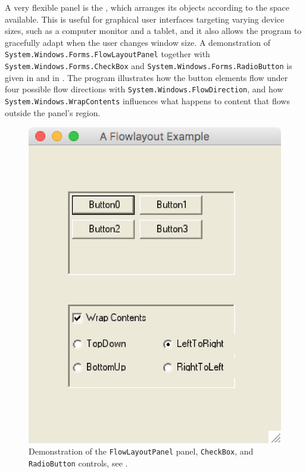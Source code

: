 \documentclass[fsharpNotes.tex]{subfiles}
\begin{document}
A very flexible panel is the , which arranges its objects according to the space available. This is useful for graphical user interfaces targeting varying device sizes, such as a computer monitor and a tablet, and it also allows the program to gracefully adapt when the user changes window size. A demonstration of \lstinline{System.Windows.Forms.FlowLayoutPanel} together with \lstinline{System.Windows.Forms.CheckBox} and \lstinline{System.Windows.Forms.RadioButton} is given in  and in . The program illustrates how the button elements flow under four possible flow directions with \lstinline{System.Windows.FlowDirection}, and how \lstinline{System.Windows.WrapContents} influences what happens to content that flows outside the panel's region. 
%
%
%
\begin{figure}
  \centering
  \includegraphics[scale=0.3]{flowLayoutPanel}
  \caption{Demonstration of the \lstinline!FlowLayoutPanel! panel, \lstinline!CheckBox!, and \lstinline!RadioButton! controls, see .}
  \label{fig:flowLayoutPanel}
\end{figure}
\end{document}
